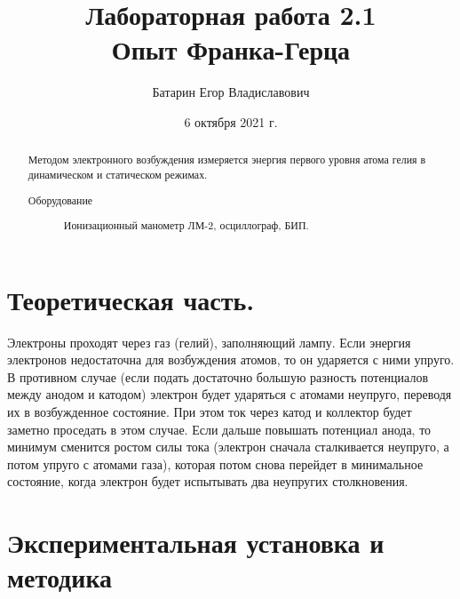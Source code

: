 \documentclass[%
 reprint,
 amsmath,amssymb,
 aps,
]{revtex4-2}
\begin{document}
\title{Лабораторная работа 2.1\\Опыт Франка-Герца}%



\author{Батарин Егор Владиславович}
%


\date{6 октября 2021 г.}%
             

\begin{abstract}
Методом электронного возбуждения измеряется энергия первого уровня атома гелия в динамическом и статическом режимах.
\begin{description}
\item[Оборудование]
Ионизационный манометр ЛМ-2, осциллограф, БИП.
\end{description}
\end{abstract}

\maketitle


\section{Теоретическая часть.}

Электроны проходят через газ (гелий), заполняющий лампу. Если энергия электронов недостаточна для возбуждения атомов, то он ударяется с ними упруго. В противном случае (если подать достаточно большую разность потенциалов между анодом и катодом) электрон будет ударяться с атомами неупруго, переводя их в возбужденное состояние. При этом ток через катод и коллектор будет заметно проседать в этом случае. Если дальше повышать потенциал анода, то минимум сменится ростом силы тока (электрон сначала сталкивается неупруго, а потом упруго с атомами газа), которая потом снова перейдет в минимальное состояние, когда электрон будет испытывать два неупругих столкновения.


\section{Экспериментальная установка и методика}
\end{document}
